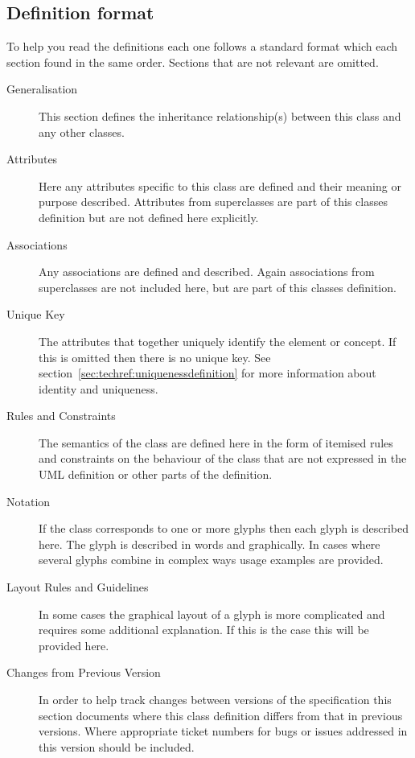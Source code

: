 \subsection{Definition format}

 To help you read the definitions each one follows a standard format
which each section found in the same order.  Sections that are not
relevant are omitted.

\begin{description}
\item[Generalisation]  This section defines the inheritance relationship(s) between this
class and any other classes.
\item[Attributes] Here any attributes specific to this class are defined and their
meaning or purpose described. Attributes from superclasses are part of
this classes definition but are not defined here explicitly.
\item[Associations] Any associations are defined and described. Again associations from
superclasses are not included here, but are part of this classes
definition.
\item[Unique Key] The attributes that together uniquely identify the
  \PD element or concept. If this is omitted then there is no unique
  key. See section~\ref{sec:techref:uniquenessdefinition} for more
  information about identity and uniqueness.
\item[Rules and Constraints] The semantics of the class are defined
  here in the form of itemised rules and constraints on the behaviour
  of the class that are not expressed in the UML definition or other
  parts of the definition.
\item[Notation] If the class corresponds to one or more glyphs then each glyph is
described here. The glyph is described in words and graphically. In
cases where several glyphs combine in complex ways usage examples are
provided.
\item[Layout Rules and Guidelines] In some cases the graphical layout of a glyph is more complicated
and requires some additional explanation. If this is the case this
will be provided here.
\item[Changes from Previous Version] In order to help track changes between versions of the specification
this section documents where this class definition differs from
that in previous versions. Where appropriate ticket numbers for bugs
or issues addressed in this version should be included.
\end{description}


